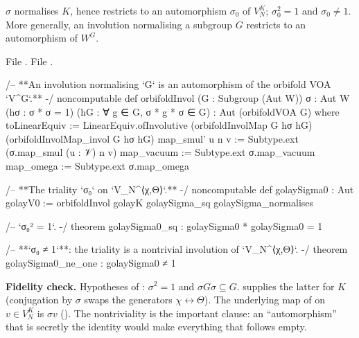 \begin{theorem}\label{ch11:thm:sigma0}
$\sigma$ normalises $K$, hence restricts to an automorphism $\sigma_0$ of $V_N^K$; $\sigma_0^2=1$ and
$\sigma_0\ne1$.  More generally, an involution normalising a subgroup $G$ restricts to an
automorphism of $W^G$.
\end{theorem}
\noindent File .
\noindent File .
\begin{leancode}
/-- **An involution normalising `G` is an automorphism of the orbifold VOA `V^G`.** -/
noncomputable def orbifoldInvol (G : Subgroup (Aut W)) {σ : Aut W} (hσ : σ * σ = 1)
    (hG : ∀ g ∈ G, σ * g * σ ∈ G) : Aut (orbifoldVOA G) where
  toLinearEquiv := LinearEquiv.ofInvolutive (orbifoldInvolMap G hσ hG) (orbifoldInvolMap_invol G hσ hG)
  map_smul' u n v := Subtype.ext (σ.map_smul (u : 𝒱) n v)
  map_vacuum := Subtype.ext σ.map_vacuum
  map_omega := Subtype.ext σ.map_omega

/-- **The triality `σ₀` on `V_N^{⟨χ,Θ⟩}`.** -/
noncomputable def golaySigma0 : Aut golayV0 :=
  orbifoldInvol golayK golaySigma_sq golaySigma_normalises

/-- `σ₀² = 1`. -/
theorem golaySigma0_sq : golaySigma0 * golaySigma0 = 1

/-- **`σ₀ ≠ 1`**: the triality is a nontrivial involution of `V_N^{⟨χ,Θ⟩}`. -/
theorem golaySigma0_ne_one : golaySigma0 ≠ 1
\end{leancode}
\begin{dictionary}
\textbf{Fidelity check.}  Hypotheses of : $\sigma^2=1$ and $\sigma G\sigma\subseteq G$.
 supplies the latter for $K$ (conjugation by $\sigma$ swaps the generators
$\chi\leftrightarrow\Theta$).  The underlying map of  on $v\in V_N^K$ is $\sigma v$
().  The nontriviality is the important clause: an ``automorphism'' that is
secretly the identity would make everything that follows empty.
\end{dictionary}

